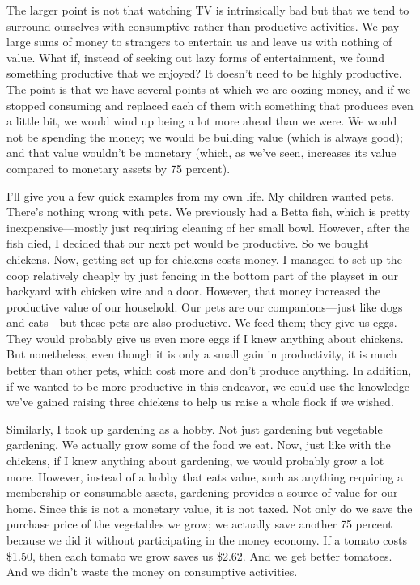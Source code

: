 The larger point is not that watching TV is intrinsically bad but that
we tend to surround ourselves with consumptive rather than productive
activities. We pay large sums of money to strangers to entertain us and
leave us with nothing of value. What if, instead of seeking out lazy
forms of entertainment, we found something productive that we enjoyed? 
It doesn’t need to be highly productive. The point is that we have
several points at which we are oozing money, and if we stopped
consuming and replaced each of them with something that produces even a
little bit, we would wind up being a lot more ahead than we were. We
would not be spending the money; we would be building value (which is
always good); and that value wouldn’t be monetary (which, as we’ve
seen, increases its value compared to monetary assets by 75 percent).

I’ll give you a few quick examples from my own life. My children wanted
pets. There’s nothing wrong with pets. We previously had a Betta fish,
which is pretty inexpensive—mostly just requiring cleaning of her small
bowl. However, after the fish died, I decided that our next pet would
be productive. So we bought chickens. Now, getting set up for chickens
costs money. I managed to set up the coop relatively cheaply by just
fencing in the bottom part of the playset in our backyard with chicken
wire and a door. However, that money increased the productive value of
our household. Our pets are our companions—just like dogs and cats—but
these pets are also productive. We feed them; they give us eggs. They
would probably give us even more eggs if I knew anything about
chickens. But nonetheless, even though it is only a small gain in
productivity, it is much better than other pets, which cost more and
don’t produce anything. In addition, if we wanted to be more productive
in this endeavor, we could use the knowledge we’ve gained raising three
chickens to help us raise a whole flock if we wished.

Similarly, I took up gardening as a hobby. Not just gardening but
vegetable gardening. We actually grow some of the food we eat. Now,
just like with the chickens, if I knew anything about gardening, we
would probably grow a lot more. However, instead of a hobby that eats
value, such as anything requiring a membership or consumable assets,
gardening provides a source of value for our home. Since this is not a
monetary value, it is not taxed. Not only do we save the purchase price
of the vegetables we grow; we actually save another 75 percent because
we did it without participating in the money economy. If a tomato costs
\$1.50, then each tomato we grow saves us \$2.62. And we get better
tomatoes. And we didn’t waste the money on consumptive activities.

